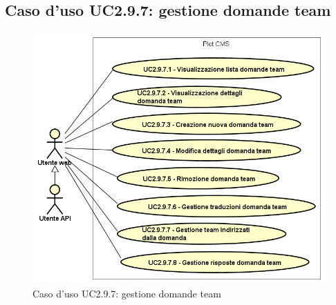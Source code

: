 \subsection{Caso d'uso UC2.9.7: gestione domande team}

        \begin{figure}
            \centering
            \includegraphics[scale=0.65, width=\textwidth]{immagini/usecase/UC2-9-7.png}
            \caption{Caso d'uso UC2.9.7: gestione domande team}\label{fig:UC2.9.7} 
        \end{figure}
